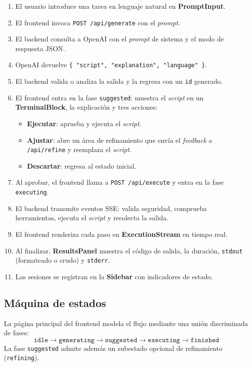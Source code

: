 \documentclass[12pt,a4paper]{article}
\begin{document}
\begin{enumerate}
    \item El usuario introduce una tarea en lenguaje natural en
    \textbf{PromptInput}.
    \item El frontend invoca \texttt{POST /api/generate} con el \textit{prompt}.
    \item El backend consulta a OpenAI con el \textit{prompt} de sistema y el
    modo de respuesta JSON.
    \item OpenAI devuelve \texttt{\{ "script", "explanation", "language" \}}.
    \item El backend valida o analiza la salida y la regresa con un \texttt{id}
    generado.
    \item El frontend entra en la fase \texttt{suggested}: muestra el
    \textit{script} en un \textbf{TerminalBlock}, la explicación y tres
    acciones:
    \begin{itemize}
        \item \textbf{Ejecutar}: aprueba y ejecuta el \textit{script}.
        \item \textbf{Ajustar}: abre un área de refinamiento que envía el
        \textit{feedback} a \texttt{/api/refine} y reemplaza el \textit{script}.
        \item \textbf{Descartar}: regresa al estado inicial.
    \end{itemize}
    \item Al aprobar, el frontend llama a \texttt{POST /api/execute} y entra en
    la fase \texttt{executing}.
    \item El backend transmite eventos SSE: valida seguridad, comprueba
    herramientas, ejecuta el \textit{script} y recolecta la salida.
    \item El frontend renderiza cada paso en \textbf{ExecutionStream} en tiempo
    real.
    \item Al finalizar, \textbf{ResultsPanel} muestra el código de salida, la
    duración, \texttt{stdout} (formateado o crudo) y \texttt{stderr}.
    \item Las sesiones se registran en la \textbf{Sidebar} con indicadores de
    estado.
\end{enumerate}

\subsection{Máquina de estados}

La página principal del frontend modela el flujo mediante una unión
discriminada de fases:
\[
\texttt{idle} \rightarrow \texttt{generating} \rightarrow \texttt{suggested}
\rightarrow \texttt{executing} \rightarrow \texttt{finished}
\]
La fase \texttt{suggested} admite además un subestado opcional de refinamiento
(\texttt{refining}).
\end{document}
